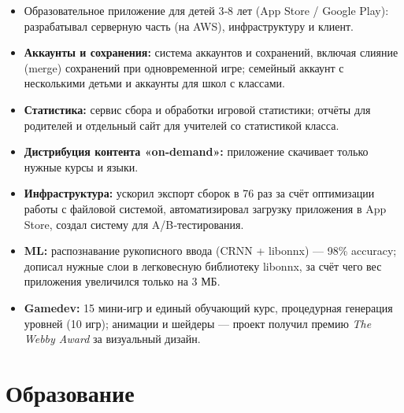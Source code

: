 \documentclass{dodiresume}
\begin{document}


\begin{itemize}
\item Образовательное приложение для детей 3‑8 лет (App Store / Google Play): разрабатывал серверную часть (на AWS), инфраструктуру и клиент.
\item \textbf{Аккаунты и сохранения:} система аккаунтов и сохранений, включая слияние (merge) сохранений при одновременной игре; семейный аккаунт с несколькими детьми и аккаунты для школ с классами.
\item \textbf{Статистика:} сервис сбора и обработки игровой статистики; отчёты для родителей и отдельный сайт для учителей со статистикой класса.
\item \textbf{Дистрибуция контента «on‑demand»:} приложение скачивает только нужные курсы и языки.
\item \textbf{Инфраструктура:} ускорил экспорт сборок в 76 раз за счёт оптимизации работы с файловой системой, автоматизировал загрузку приложения в App Store, создал систему для A/B‑тестирования.
\item \textbf{ML:} распознавание рукописного ввода (CRNN + libonnx) — 98\% accuracy; дописал нужные слои в легковесную библиотеку libonnx, за счёт чего вес приложения увеличился только на 3 МБ.
\item \textbf{Gamedev:} 15 мини‑игр и единый обучающий курс, процедурная генерация уровней (10 игр); анимации и шейдеры — проект получил премию \textit{The Webby Award} за визуальный дизайн.
\end{itemize}

\section{Образование}


\vspace{0.3cm}

\end{document}
